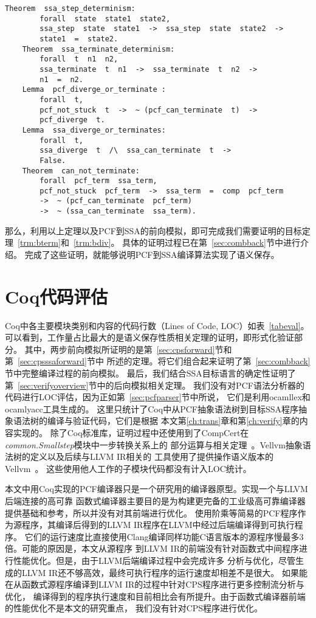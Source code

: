 \vspace{1ex}
\begin{lstlisting}[language=Coq, caption=Coq中后向模拟证明所需的定理, label=code:back]  
    Theorem  ssa_step_determinism:
        forall  state  state1  state2,
        ssa_step  state  state1  ->  ssa_step  state  state2  ->
        state1  =  state2.
    Theorem  ssa_terminate_determinism:
        forall  t  n1  n2,
        ssa_terminate  t  n1  ->  ssa_terminate  t  n2  ->
        n1  =  n2.
    Lemma  pcf_diverge_or_terminate :
        forall  t,
        pcf_not_stuck  t  ->  ~ (pcf_can_terminate  t)  -> 
        pcf_diverge  t.
    Lemma  ssa_diverge_or_terminates:
        forall  t,
        ssa_diverge  t  /\  ssa_can_terminate  t  ->
        False.
    Theorem  can_not_terminate:
        forall  pcf_term  ssa_term,
        pcf_not_stuck  pcf_term  ->  ssa_term  =  comp  pcf_term 
        ->  ~ (pcf_can_terminate  pcf_term)  
        ->  ~ (ssa_can_terminate  ssa_term).
\end{lstlisting}

那么，利用以上定理以及PCF到SSA的前向模拟，即可完成我们需要证明的目标定理~\ref{trm:bterm}和~\ref{trm:bdiv}。
具体的证明过程已在第~\ref{sec:combback}节中进行介绍。
完成了这些证明，就能够说明PCF到SSA编译算法实现了语义保存。

\section{Coq代码评估}

Coq中各主要模块类别和内容的代码行数（Lines of Code, LOC）如表~\ref{tabeval}。
可以看到，工作量占比最大的是语义保存性质相关定理的证明，即形式化验证部分。
其中，两步前向模拟所证明的是第~\ref{sec:cpsforward}节和第~\ref{sec:cpsssaforward}节中
所述的定理。将它们组合起来证明了第~\ref{sec:combback}节中完整编译过程的前向模拟。
最后，我们结合SSA目标语言的确定性证明了第~\ref{sec:verifyoverview}节中的后向模拟相关定理。
我们没有对PCF语法分析器的代码进行LOC评估，因为正如第~\ref{sec:pcfparser}节中所说，
它们是利用ocamllex和ocamlyacc工具生成的。
这里只统计了Coq中从PCF抽象语法树到目标SSA程序抽象语法树的编译与验证代码，它们是根据
本文第\ref{ch:trans}章和第\ref{ch:verify}章的内容实现的。
除了Coq标准库，证明过程中还使用到了CompCert在\textit{common.Smallstep}模块中一步转换关系上的
部分运算与相关定理~\cite{leroy2009formally}。Vellvm抽象语法树的定义以及后续与LLVM IR相关的
工具使用了提供操作语义版本的Vellvm~\cite{vellvm2012}。
这些使用他人工作的子模块代码都没有计入LOC统计。

本文中用Coq实现的PCF编译器只是一个研究用的编译器原型。实现一个与LLVM后端连接的高可靠
函数式编译器主要目的是为构建更完备的工业级高可靠编译器提供基础和参考，所以并没有对其前端进行优化。
使用阶乘等简易的PCF程序作为源程序，其编译后得到的LLVM IR程序在LLVM中经过后端编译得到可执行程序。
它们的运行速度比直接使用Clang编译同样功能C语言版本的源程序慢最多3倍。可能的原因是，本文从源程序
到LLVM IR的前端没有针对函数式中间程序进行性能优化。但是，由于LLVM后端编译过程中会完成许多
分析与优化，尽管生成的LLVM IR还不够高效，最终可执行程序的运行速度却相差不是很大。
如果能在从函数式源程序编译到LLVM IR的过程中针对CPS程序进行更多控制流分析与优化，
编译得到的程序执行速度和目前相比会有所提升。由于函数式编译器前端的性能优化不是本文的研究重点，
我们没有针对CPS程序进行优化。


